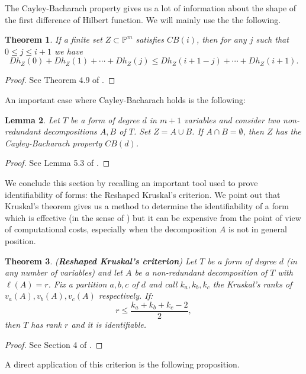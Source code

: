 \documentclass[a4paper,10pt,oneside]{article}
\theoremstyle{casep}
\newcommand{\Pj}{\mathbb{P}}
\newtheorem{theorem}{Theorem}[section]
\newtheorem{lemma}[theorem]{Lemma}
\theoremstyle{definition}
\begin{document}
The Cayley-Bacharach property gives us a lot of information about the shape of the first difference of Hilbert function. We will mainly use the the following.

\begin{theorem}\label{GKRext}
If a finite set $ Z \subset \Pj^{m} $ satisfies $\mathit{CB}(i)$, then for any $ j $ such that $ 0 \leq j \leq i+1 $ we have
$$ Dh_{Z}(0)+Dh_{Z}(1)+\cdots + Dh_{Z}(j) \leq Dh_{Z}(i+1-j)+\cdots +Dh_{Z}(i+1).$$
\end{theorem}
\begin{proof} See Theorem 4.9 of \cite{otto}.


\end{proof}

An important case where Cayley-Bacharach holds is the following:

\begin{lemma}\label{CBdis}
Let $T$ be a form of degree $ d $ in $ m+1 $ variables and consider two non-redundant decompositions $A, B$ of $T$. 
Set $Z= A \cup B$. If $A \cap B = \emptyset$, then $Z$ has the Cayley-Bacharach property $CB(d)$.
\end{lemma}
\begin{proof} See Lemma 5.3 of \cite{nove}.

\end{proof}

We conclude this section by recalling an important tool used to prove identifiability of forms: the Reshaped Kruskal's criterion. 
We point out that Kruskal's theorem gives us a method to determine the identifiability of a form which is effective
(in the sense of \cite{sette}) but it can be expensive from the point of view of computational costs, especially when the decomposition $A$ is not in general position. 

\begin{theorem} \label{K} ({\bf Reshaped Kruskal's criterion}) Let $T$ be a form of degree $d$ (in any number of variables) and let $A$ be a non-redundant decomposition of $T$ with $\ell(A)=r$. Fix a partition $a,b,c$ of $d$ and call $k_a,k_b,k_c$ the Kruskal's ranks of $v_a(A),v_b(A), v_c(A)$ respectively.
If: $$ r\leq \frac {k_a+k_b+k_c-2}2,$$
then $T$ has rank $r$ and it is identifiable.
\end{theorem}
\begin{proof} See Section 4 of \cite{dieci}.


\end{proof}

A direct application of this criterion is the following proposition.
\end{document}
